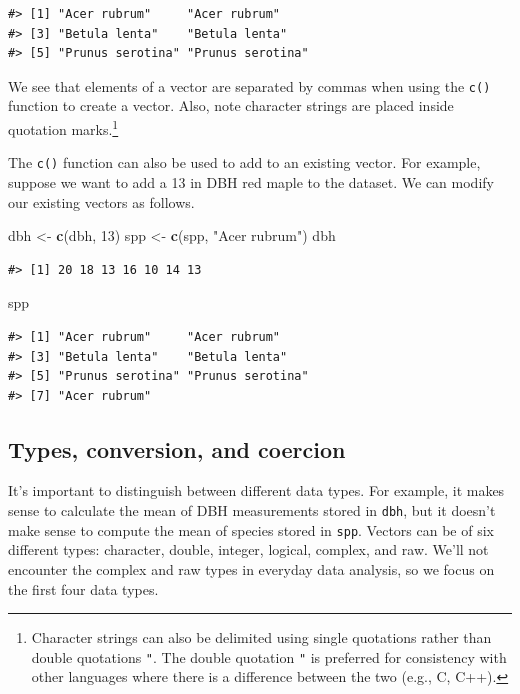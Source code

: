 \documentclass[
  11pt,
]{krantz}
\newenvironment{Shaded}{\begin{snugshade}}{\end{snugshade}}
\newcommand{\DecValTok}[1]{\textcolor[rgb]{0.00,0.00,0.81}{#1}}
\newcommand{\KeywordTok}[1]{\textcolor[rgb]{0.13,0.29,0.53}{\textbf{#1}}}
\newcommand{\NormalTok}[1]{#1}
\newcommand{\StringTok}[1]{\textcolor[rgb]{0.31,0.60,0.02}{#1}}
\theoremstyle{definition}
\theoremstyle{definition}
\theoremstyle{definition}
\theoremstyle{definition}
\theoremstyle{remark}
\begin{document}
\begin{verbatim}
#> [1] "Acer rubrum"     "Acer rubrum"    
#> [3] "Betula lenta"    "Betula lenta"   
#> [5] "Prunus serotina" "Prunus serotina"
\end{verbatim}

We see that elements of a vector are separated by commas when using the \texttt{c()} function to create a vector. Also, note character strings are placed inside quotation marks.\footnote{Character strings can also be delimited using single quotations \texttt{\textquotesingle{}} rather than double quotations \texttt{"}. The double quotation \texttt{"} is preferred for consistency with other languages where there is a difference between the two (e.g., C, C++).}

The \texttt{c()} function can also be used to add to an existing vector. For example, suppose we want to add a 13 in DBH red maple to the dataset. We can modify our existing vectors as follows.

\begin{Shaded}
\begin{Highlighting}[]
\NormalTok{dbh \textless{}{-}}\StringTok{ }\KeywordTok{c}\NormalTok{(dbh, }\DecValTok{13}\NormalTok{)}
\NormalTok{spp \textless{}{-}}\StringTok{ }\KeywordTok{c}\NormalTok{(spp, }\StringTok{"Acer rubrum"}\NormalTok{)}
\NormalTok{dbh}
\end{Highlighting}
\end{Shaded}

\begin{verbatim}
#> [1] 20 18 13 16 10 14 13
\end{verbatim}

\begin{Shaded}
\begin{Highlighting}[]
\NormalTok{spp}
\end{Highlighting}
\end{Shaded}

\begin{verbatim}
#> [1] "Acer rubrum"     "Acer rubrum"    
#> [3] "Betula lenta"    "Betula lenta"   
#> [5] "Prunus serotina" "Prunus serotina"
#> [7] "Acer rubrum"
\end{verbatim}

\hypertarget{dataTypes}{%
\subsection{Types, conversion, and coercion}\label{dataTypes}}

It's important to distinguish between different data types. For example, it makes sense to calculate the mean of DBH measurements stored in \texttt{dbh}, but it doesn't make sense to compute the mean of species stored in \texttt{spp}. Vectors can be of six different types: character, double, integer, logical, complex, and raw. We'll not encounter the complex and raw types in everyday data analysis, so we focus on the first four data types.
\end{document}
